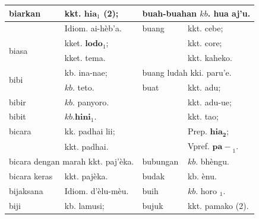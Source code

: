 \documentclass[10pt]{article}
\begin{document}
\begin{center}
\begin{tabular}{|l|l|l|l|}
\hline
\multirow[t]{2}{*}{biarkan} & kkt. \(\mathbf{h i a}_{1}\) (2); & \multicolumn{2}{|l|}{buah-buahan \(k b\). hua aj'u.} \\
\hline
 & Idiom. ai-hèb'a. & buang & kkt. cebe; \\
\hline
\multirow[t]{2}{*}{biasa} & kket. \(\mathbf{l o d o}_{1}\); &  & kkt. core; \\
\hline
 & kket. tema. &  & kkt. kaheko. \\
\hline
\multirow[t]{2}{*}{bibi} & kb. ina-nae; & \multicolumn{2}{|l|}{buang ludah kki. paru'e.} \\
\hline
 & \(k b\). teto. & buat & kkt. adu; \\
\hline
bibir & \(k b\). panyoro. &  & kkt. adu-ue; \\
\hline
bibit & \(k b . \mathbf{h i n i}_{1}\). &  & kkt. tao; \\
\hline
bicara & kk. padhai lii; &  & Prep. \(\mathbf{h i a}_{\mathbf{2}}\); \\
\hline
 & kkt. padhai. &  & Vpref. \(\mathbf{p a -}_{1}\). \\
\hline
\multicolumn{2}{|l|}{bicara dengan marah kkt. paj'èka.} & bubungan & \(k b\). bhèngu. \\
\hline
bicara keras & kkt. pajèka. & budak & kb. ènu. \\
\hline
bijaksana & Idiom. d'èlu-mèu. & buih & \(k b\). horo \(_{1}\). \\
\hline
biji & kb. lamusi; & bujuk & kkt. pamako (2). \\
\hline
\end{tabular}
\end{center}
\end{document}
